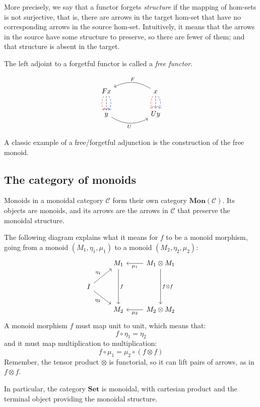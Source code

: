 \documentclass[DaoFP]{subfiles}
\begin{document}
More precisely, we say that a functor forgets \emph{structure} if the mapping of hom-sets is not surjective, that is, there are arrows in the target hom-set that have no corresponding arrows in the source hom-set. Intuitively, it means that the arrows in the source have some structure to preserve, so there are fewer of them; and that structure is absent in the target. 

The left adjoint to a forgetful functor is called a \emph{free functor}.

\[
 \begin{tikzcd}
F x
\arrow[d, bend right, red, dashed]
\arrow[d, dashed]
\arrow[d, bend left, blue, dashed]
  &&
  x
\arrow[d, bend right, red, dashed]
\arrow[d, dashed]
\arrow[d, bend left, blue, dashed]
 \arrow[ll, bend right, "F"']
 \\
y
   \arrow[rr, bend right, "U"']
 &&
 U y
  \end{tikzcd}
\]

A classic example of a free/forgetful adjunction is the construction of the free monoid.


\subsection{The category of monoids}
Monoids in a monoidal category $\mathcal{C}$ form their own category $\mathbf{Mon}(\mathcal{C})$. Its objects are monoids, and its arrows are the arrows in $\mathcal{C}$ that preserve the monoidal structure. 

The following diagram explains what it means for $f$ to be a monoid morphism, going from a monoid $(M_1, \eta_1, \mu_1)$ to a monoid $(M_2, \eta_2, \mu_2)$:
\[
 \begin{tikzcd}
 & M_1
 \arrow[dd, "f"]
 & M_1 \otimes M_1
 \arrow[l, "\mu_1"]
 \arrow[dd, "f \otimes f"]
 \\
 I
 \arrow[ru, "\eta_1"]
 \arrow[rd, "\eta_2"']
 \\
 & M_2
 & M_2 \otimes M_2
 \arrow[l, "\mu_2"]
  \end{tikzcd}
\]
A monoid morphism $f$ must map unit to unit, which means that:
\[ f \circ \eta_1 = \eta_2 \]
and it must map multiplication to multiplication:
\[ f \circ \mu_1 = \mu_2 \circ (f \otimes f)\]
Remember, the tensor product $\otimes$ is functorial, so it can lift pairs of arrows, as in $f \otimes f$.

In particular, the category $\mathbf{Set}$ is monoidal, with cartesian product and the terminal object providing the monoidal structure. 
\end{document}
